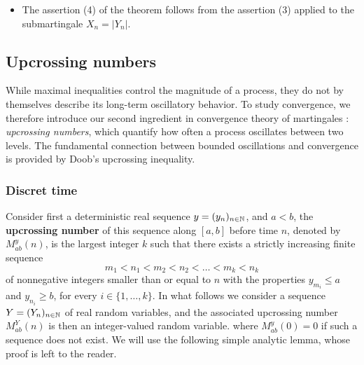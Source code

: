\documentclass[../Main.tex]{subfiles}
\begin{document}
{\begin{itemize}
    using the Fubini theorem. Similarly, we get for the right side
    \begin{align*}
        \int_{0}^{\infty} a^{p-2} \EE[X_n \1_{\{\widetilde{X}_n \geq a\}}] \, da &= \EE \left[ X_n \int_{0}^{\widetilde{X}_n} a^{p-2} da \right] \\
        &= \frac{1}{p-1} \EE[X_n (\widetilde{X}_n)^{p-1}] \\
        &\leq \frac{1}{p-1} \EE[(X_n)^p]^{\frac{1}{p}} \EE[(\widetilde{X}_n)^p]^{\frac{p-1}{p}}
    \end{align*}
    by the Hölder inequality. We thus get
    \[ \frac{1}{p} \EE[(\widetilde{X}_n)^p] \leq \frac{1}{p-1} \EE[(X_n)^p]^{\frac{1}{p}} \EE[(\widetilde{X}_n)^p]^{\frac{p-1}{p}} \]
    giving the assertion (1) of the theorem (we use the fact that $\EE[(\widetilde{X}_n)^p] < \infty$). Then for the continuous case, we can use the same argument as in assertion (1) by considering a countable dense subset $D$ of $\RR_+$ such that $0 \in D$ and $t \in D$, and then applying the discrete case to the sequence $Y_n = X_{t^m_{n \wedge m}}$ for every fixed $m$. 

    \item The assertion (4) of the theorem follows from the assertion (3) applied to the submartingale $X_n = |Y_n|$. 
\end{itemize}
}

\subsection{Upcrossing numbers}
While maximal inequalities control the magnitude of a process, they do not by themselves describe its long-term oscillatory behavior. To study convergence, we therefore introduce our second ingredient in convergence theory of martingales : \textit{upcrossing numbers}, which quantify how often a process oscillates between two levels. The fundamental connection between bounded oscillations and convergence is provided by Doob's upcrossing inequality.

\subsubsection{Discret time}
Consider first a deterministic real sequence $y = (y_n)_{n \in \mathbb{N}}$, and $a < b$, the \textbf{upcrossing number} of this sequence along $[a, b]$ before time $n$, denoted by $M_{ab}^y(n)$, is the largest integer $k$ such that there exists a strictly increasing finite sequence
    \[ m_1 < n_1 < m_2 < n_2 < \dots < m_k < n_k \]
of nonnegative integers smaller than or equal to $n$ with the properties $y_{m_i} \le a$ and $y_{n_i} \ge b$, for every $i \in \{1, \dots, k\}$. In what follows we consider a sequence $Y = (Y_n)_{n \in \mathbb{N}}$ of real random variables, and the associated upcrossing number $M_{ab}^Y(n)$ is then an integer-valued random variable. where $M_{ab}^y(0) = 0$ if such a sequence does not exist.
We will use the following simple analytic lemma, whose proof is left to the reader.
\end{document}
